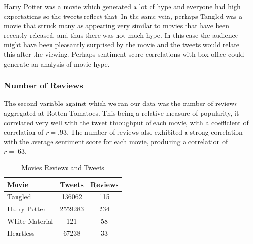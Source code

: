 \documentclass[11pt]{article}
\begin{document}
Harry Potter was a movie which generated a lot of hype and everyone had high expectations so the tweets reflect that. In the same vein, perhaps Tangled was a movie that struck many as appearing very similar to movies that have been recently released, and thus there was not much hype. In this case the audience might have been pleasantly surprised by the movie and the tweets would relate this after the viewing. Perhaps sentiment score correlations with box office could generate an analysis of movie hype.

\subsubsection{Number of Reviews}
The second variable against which we ran our data was the number of reviews aggregated at Rotten Tomatoes. This being a relative measure of popularity, it correlated very well with the tweet throughput of each movie, with a coefficient of correlation of $r=.93$. The number of reviews also exhibited a strong correlation with the average sentiment score for each movie, producing a correlation of $r=.63$.
\begin{table}[ht!]
\centering
\caption{Movies Reviews and Tweets}
\begin{tabular}{|l|c|c|}
\hline
 Movie & Tweets & Reviews \\
\hline
Tangled& 136062& 115 \\
\hline
Harry Potter & 2559283 & 234\\
\hline
White Material & 121 & 58\\
\hline
Heartless &67238& 33\\
\hline
\end{tabular}
\end{table}
\end{document}
